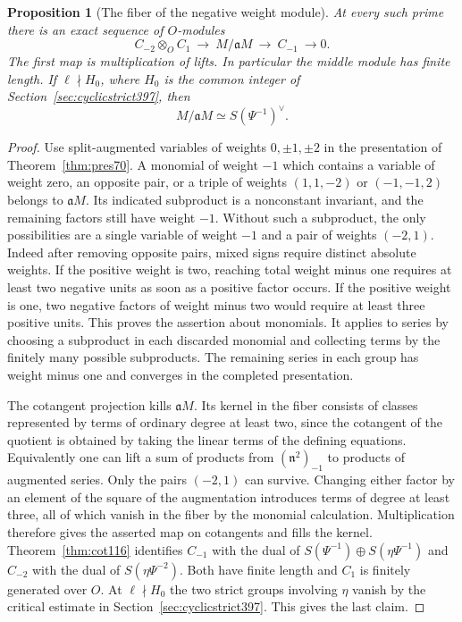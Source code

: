 \documentclass[a4paper,11pt]{article}
\newtheorem{proposition}{Proposition}[section]
\theoremstyle{definition}
\theoremstyle{remark}
\numberwithin{equation}{section}
\begin{document}
\begin{proposition}[The fiber of the negative weight module]\leavevmode
\label{prop:negfiber398}
At every such prime there is an exact sequence of \(O\)-modules
\[
 C_{-2}\otimes_O C_1\ \longrightarrow\ M/\mathfrak aM
     \ \longrightarrow\ C_{-1}\ \longrightarrow 0 .
\]
The first map is multiplication of lifts. In particular the middle
module has finite length. If \(\ell\nmid H_0\), where \(H_0\) is
the common integer of Section~\ref{sec:cyclicstrict397}, then
\[
              M/\mathfrak aM\simeq S(\Psi^{-1})^\vee .
\]
\end{proposition}
\begin{proof}
Use split-augmented variables of weights \(0,\pm1,\pm2\) in the
presentation of Theorem~\ref{thm:pres70}. A monomial of weight
\(-1\) which contains a variable of weight zero, an opposite pair,
or a triple of weights \((1,1,-2)\) or \((-1,-1,2)\) belongs
to \(\mathfrak aM\). Its indicated subproduct is a nonconstant
invariant, and the remaining factors still have weight \(-1\).
Without such a subproduct, the only possibilities are a single
variable of weight \(-1\) and a pair of weights \((-2,1)\).
Indeed after removing opposite pairs, mixed signs require distinct
absolute weights. If the positive weight is two, reaching total
weight minus one requires at least two negative units as soon as
a positive factor occurs. If the positive weight is one, two
negative factors of weight minus two would require at least three
positive units. This proves the assertion about monomials. It
applies to series by choosing a subproduct in each discarded
monomial and collecting terms by the finitely many possible
subproducts. The remaining series in each group has weight minus
one and converges in the completed presentation.

The cotangent projection kills \(\mathfrak aM\). Its kernel in the
fiber consists of classes represented by terms of ordinary degree
at least two, since the cotangent of the quotient is obtained
by taking the linear terms of the defining equations. Equivalently
one can lift a sum of products from \((\mathfrak n^2)_{-1}\)
to products of augmented series. Only the pairs \((-2,1)\)
can survive. Changing either factor by an element of the square
of the augmentation introduces terms of degree at least three,
all of which vanish in the fiber by the monomial calculation.
Multiplication therefore gives the asserted map on cotangents
and fills the kernel. Theorem~\ref{thm:cot116} identifies
\(C_{-1}\) with the dual of
\(S(\Psi^{-1})\oplus S(\eta\Psi^{-1})\) and \(C_{-2}\) with the
dual of \(S(\eta\Psi^{-2})\). Both have finite length and \(C_1\)
is finitely generated over \(O\). At \(\ell\nmid H_0\) the two
strict groups involving \(\eta\) vanish by the critical estimate
in Section~\ref{sec:cyclicstrict397}. This gives the last claim.
\end{proof}
\end{document}
